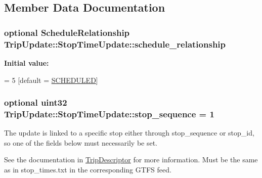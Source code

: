 \subsection{Member Data Documentation}
\subsubsection[{\texorpdfstring{schedule\+\_\+relationship}{schedule_relationship}}]{\setlength{\rightskip}{0pt plus 5cm}optional {\bf Schedule\+Relationship} Trip\+Update\+::\+Stop\+Time\+Update\+::schedule\+\_\+relationship}\hypertarget{structTripUpdate_1_1StopTimeUpdate_a85a387be59e80b1f006d39096b96bfdc}{}\label{structTripUpdate_1_1StopTimeUpdate_a85a387be59e80b1f006d39096b96bfdc}
{\bfseries Initial value\+:}
\begin{DoxyCode}
= 5
        [\textcolor{keywordflow}{default} = \hyperlink{structTripUpdate_1_1StopTimeUpdate_a624ef1349bfc24a44984c33761070726ad2bf6182562045f8d4494f2b90979475}{SCHEDULED}]
\end{DoxyCode}
\subsubsection[{\texorpdfstring{stop\+\_\+sequence}{stop_sequence}}]{\setlength{\rightskip}{0pt plus 5cm}optional uint32 Trip\+Update\+::\+Stop\+Time\+Update\+::stop\+\_\+sequence = 1}\hypertarget{structTripUpdate_1_1StopTimeUpdate_a0d9f654ecd536657ee00b1c1cbe428aa}{}\label{structTripUpdate_1_1StopTimeUpdate_a0d9f654ecd536657ee00b1c1cbe428aa}


The update is linked to a specific stop either through stop\+\_\+sequence or stop\+\_\+id, so one of the fields below must necessarily be set. 

See the documentation in \hyperlink{structTripDescriptor}{Trip\+Descriptor} for more information. Must be the same as in stop\+\_\+times.\+txt in the corresponding G\+T\+FS feed. 
